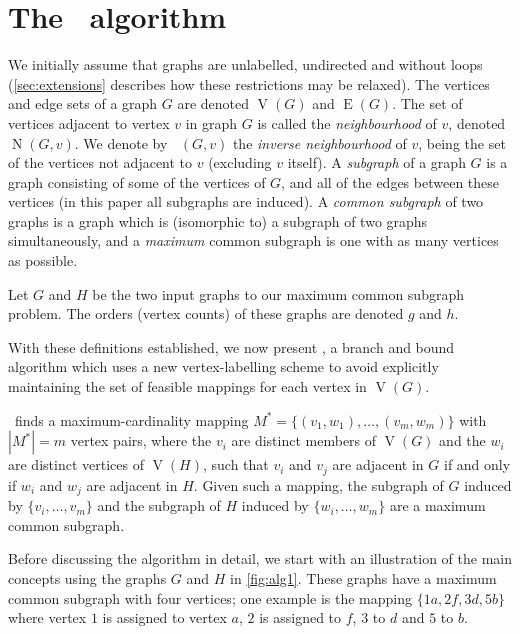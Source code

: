 \documentclass[letterpaper]{article}
\newcommand{\McSplit}{\textproc{McSplit}}
\DeclareMathOperator{\V}{V}
\DeclareMathOperator{\E}{E}
\DeclareMathOperator{\N}{N}
\DeclareMathOperator{\invN}{\overline{N}}
\begin{document}
\section{The \McSplit\ algorithm}

We initially assume that graphs are unlabelled, undirected and without loops
(\cref{sec:extensions} describes how these restrictions may be relaxed).
The vertices and edge sets of a graph $G$ are denoted $\V(G)$ and $\E(G)$.  The
set of vertices adjacent to vertex $v$ in graph $G$ is called the
\emph{neighbourhood} of $v$, denoted $\N(G, v)$. We denote by $\invN(G, v)$ the
\emph{inverse neighbourhood} of $v$, being the set of the vertices not adjacent
to $v$ (excluding $v$ itself). A \emph{subgraph} of a graph $G$ is a graph
consisting of some of the vertices of $G$, and all of the edges between these
vertices (in this paper all subgraphs are induced). A \emph{common subgraph} of
two graphs is a graph which is (isomorphic to) a subgraph of two graphs
simultaneously, and a \emph{maximum} common subgraph is one with as many
vertices as possible.

Let $G$ and $H$ be the two input graphs to our maximum common subgraph problem.
The orders (vertex counts) of these graphs are denoted $g$ and $h$.

With these definitions established, we now present \McSplit, a branch and bound
algorithm which uses a new vertex-labelling scheme to avoid explicitly
maintaining the set of feasible mappings for each vertex in $\V(G)$.

\McSplit\ finds a maximum-cardinality mapping $M^* = \{(v_1, w_1), \dots,
(v_{m}, w_{m})\}$ with $|M^*| = m$ vertex pairs, where the $v_i$ are distinct members of $\V(G)$ and the
$w_i$ are distinct vertices of $\V(H)$, such that $v_i$ and $v_j$ are adjacent
in $G$ if and only if $w_i$ and $w_j$ are adjacent in $H$. 
Given such a mapping, the subgraph of $G$ induced by $\{v_i, \dots, v_{m}\}$
and the subgraph of $H$ induced by $\{w_i, \dots, w_{m}\}$ are a maximum
common subgraph.

Before discussing the algorithm in detail, we start with an illustration of the
main concepts using the graphs $G$ and $H$ in \cref{fig:alg1}.  These graphs
have a maximum common subgraph with four vertices; one example is the mapping
$\{1a, 2f, 3d, 5b\}$ where vertex $1$ is assigned to vertex $a$, $2$ is
assigned to $f$, $3$ to $d$ and $5$ to $b$.
\end{document}
